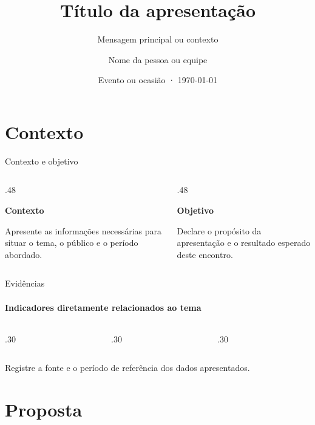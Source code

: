 \documentclass[aspectratio=169,11pt]{beamer}
\title[Título breve]{Título da apresentação}
\subtitle{Mensagem principal ou contexto}
\author{Nome da pessoa ou equipe}
\institute{Capítulo Estudantil da IEEE Computer Society na UFG}
\date{Evento ou ocasião · \today}
\begin{document}
\begin{frame}
  \titlepage
\end{frame}

\section{Contexto}

\begin{frame}{Contexto e objetivo}
  \begin{columns}[T,onlytextwidth]
    \begin{column}{.48\textwidth}
      {\IEEECSHeadingFont\bfseries\color{IEEEBlue}Contexto\par}
      \medskip
      Apresente as informações necessárias para situar o tema, o público e o
      período abordado.
    \end{column}
    \begin{column}{.48\textwidth}
      {\IEEECSHeadingFont\bfseries\color{IEEEBlue}Objetivo\par}
      \medskip
      Declare o propósito da apresentação e o resultado esperado deste
      encontro.
    \end{column}
  \end{columns}
\end{frame}

\begin{frame}{Evidências}
  \framesubtitle{Indicadores diretamente relacionados ao tema}
  \begin{columns}[T,onlytextwidth]
    \begin{column}{.30\textwidth}
    \end{column}
    \begin{column}{.30\textwidth}
    \end{column}
    \begin{column}{.30\textwidth}
    \end{column}
  \end{columns}
  \vfill
  Registre a fonte e o período de referência dos dados apresentados.
\end{frame}

\section{Proposta}
\end{document}
